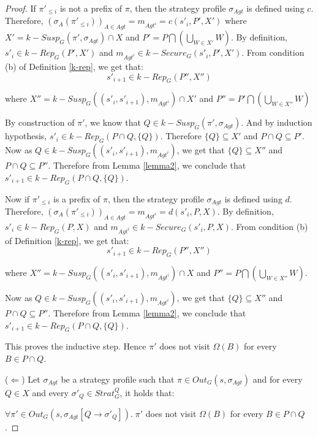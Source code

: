 \begin{proof}
If $\pi'_{\leq i}$ is not a prefix of $\pi$, then the strategy profile $\sigma_{Agt}$ is defined using $c$. Therefore, $(\sigma_{A}(\pi'_{\leq i}))_{A\in Agt} = m_{Agt^{i}} = c(s'_{i}, P', X')$ where $X' = k-Susp_{G}(\pi', \sigma_{Agt}) \cap X$ and $P' = P \bigcap \left( \bigcup \limits_{W \in X'}W \right)$. By definition, $s'_{i} \in k-Rep_{G}(P', X')$ and $m_{Agt^{i}} \in k-Secure_{G}(s'_{i}, P', X')$. From condition (b) of Definition \ref{k-rep}, we get that:
\[s'_{i+1} \in k-Rep_{G}(P'', X'')\]

where $X'' = k-Susp_{G}((s'_{i}, s'_{i+1}), m_{Agt^{i}}) \cap X'$ and $P'' = P' \bigcap \left( \bigcup \limits_{W \in X''}W \right)$

By construction of $\pi'$, we know that $Q \in k-Susp_{G}(\pi', \sigma_{Agt})$. And by induction hypothesis, $s'_{i} \in k-Rep_{G}(P \cap Q, \lbrace Q \rbrace)$. Therefore $\lbrace Q \rbrace \subseteq X'$ and $P \cap Q \subseteq P'$. Now as $Q \in k-Susp_{G}((s'_{i}, s'_{i+1}), m_{Agt^{i}})$, we get that $\lbrace Q \rbrace \subseteq X''$ and $P \cap Q \subseteq P''$. Therefore from Lemma \ref{lemma2}, we conclude that $s'_{i+1} \in k-Rep_{G}(P \cap Q, \lbrace Q \rbrace)$.

Now if $\pi'_{\leq i}$ is a prefix of $\pi$, then the strategy profile $\sigma_{Agt}$ is defined using $d$. Therefore, $(\sigma_{A}(\pi'_{\leq i}))_{A\in Agt} = m_{Agt^{i}} = d(s'_{i}, P, X)$. By definition, $s'_{i} \in k-Rep_{G}(P, X)$ and $m_{Agt^{i}} \in k-Secure_{G}(s'_{i}, P, X)$. From condition (b) of Definition \ref{k-rep}, we get that:
\[s'_{i+1} \in k-Rep_{G}(P'', X'')\]

where $X'' = k-Susp_{G}((s'_{i}, s'_{i+1}), m_{Agt^{i}}) \cap X$ and $P'' = P \bigcap \left( \bigcup \limits_{W \in X''}W \right)$.

Now as $Q \in k-Susp_{G}((s'_{i}, s'_{i+1}), m_{Agt^{i}})$, we get that $\lbrace Q \rbrace \subseteq X''$ and $P \cap Q \subseteq P''$. Therefore from Lemma \ref{lemma2}, we conclude that $s'_{i+1} \in k-Rep_{G}(P \cap Q, \lbrace Q \rbrace)$.

This proves the inductive step. Hence $\pi'$ does not visit $\Omega(B)$ for every $B \in P \cap Q$.

($\Leftarrow$) Let $\sigma_{Agt}$ be a strategy profile such that $\pi \in Out_{G}(s, \sigma_{Agt})$ and for every $Q \in X$ and every $\sigma'_{Q} \in Strat^{Q}_{G}$, it holds that:

$\forall \pi' \in Out_{G}(s, \sigma_{Agt}[Q \rightarrow \sigma'_{Q}]). \; \pi'$ does not visit $\Omega(B)$ for every $B \in P \cap Q$.


\end{proof}
